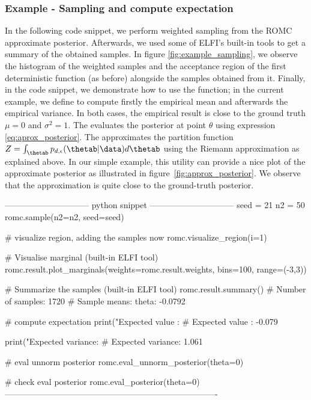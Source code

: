 \subsubsection*{Example - Sampling and compute expectation}

In the following code snippet, we perform weighted sampling from the
ROMC approximate posterior. Afterwards, we used some of ELFI's
built-in tools to get a summary of the obtained samples. In figure
\ref{fig:example_sampling}, we observe the histogram of the weighted
samples and the acceptance region of the first deterministic function
(as before) alongside the samples obtained from it. Finally, in the
code snippet, we demonstrate how to use the 
function; in the current example, we define  to compute
firstly the empirical mean and afterwards the empirical variance. In
both cases, the empirical result is close to the ground truth
$\mu = 0$ and $\sigma^2 = 1$. The
 evaluates the posterior at
point $\theta$ using expression \eqref{eq:aprox_posterior}. The
 approximates the partition function
$Z = \int_{\thetab} p_{d,\epsilon}(\thetab|\data) d\thetab$ using the
Riemann approximation as explained above. In our simple example, this
utility can provide a nice plot of the approximate posterior as
illustrated in figure~\ref{fig:approx_posterior}. We observe that the
approximation is quite close to the ground-truth posterior.



\begin{Code}
------------------------------ python snippet ------------------------------  
  seed = 21
  n2 = 50
  romc.sample(n2=n2, seed=seed)

  # visualize region, adding the samples now
  romc.visualize_region(i=1)

  # Visualise marginal (built-in ELFI tool)
  romc.result.plot_marginals(weights=romc.result.weights, bins=100, range=(-3,3))

  # Summarize the samples (built-in ELFI tool)
  romc.result.summary()
  # Number of samples: 1720
  # Sample means: theta: -0.0792

  # compute expectation
  print("Expected value   : %
  # Expected value   : -0.079

  print("Expected variance: %
  # Expected variance: 1.061

  # eval unnorm posterior
  romc.eval_unnorm_posterior(theta=0)

  # check eval posterior
  romc.eval_posterior(theta=0)
----------------------------------------------------------------------------
\end{Code}

